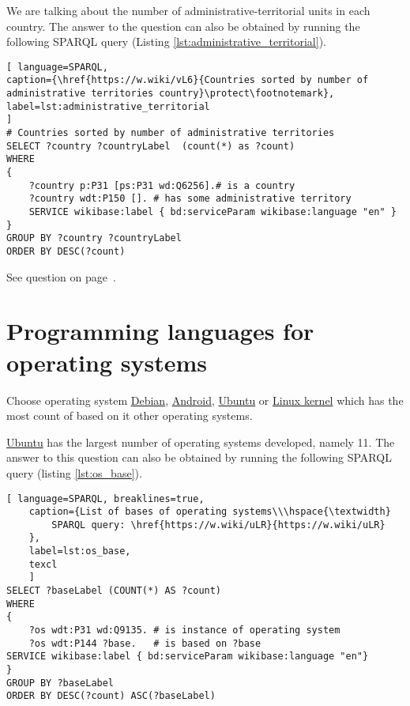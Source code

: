 We are talking about the number of administrative-territorial units in each country. The answer to the question can also be obtained by running the following SPARQL query (Listing \ref{lst:administrative_territorial}).

\begin{lstlisting}[ language=SPARQL, 
caption={\href{https://w.wiki/vL6}{Countries sorted by number of administrative territories country}\protect\footnotemark},
label=lst:administrative_territorial
]
# Countries sorted by number of administrative territories
SELECT ?country ?countryLabel  (count(*) as ?count)
WHERE
{
	?country p:P31 [ps:P31 wd:Q6256].# is a country
	?country wdt:P150 []. # has some administrative territory
	SERVICE wikibase:label { bd:serviceParam wikibase:language "en" }
}
GROUP BY ?country ?countryLabel
ORDER BY DESC(?count)
\end{lstlisting}

See question on page~\pageref{question:administrative_territorial}.




\section{Programming languages for operating systems}

\begin{exercise}%
	\label{answer:os_base}
	Choose operating system 
	\href{https://w.wiki/n8U}{Debian},
	\href{https://w.wiki/n8V}{Android},
	\href{https://w.wiki/n8W}{Ubuntu} or
	\href{https://w.wiki/n8X}{Linux kernel}
	which has the most count of based on it other operating systems.	
\end{exercise}

\href{https://w.wiki/n8W}{Ubuntu}  has the largest number of operating systems developed, namely 11. The answer to this question can also be obtained by running the following SPARQL query (listing \ref{lst:os_base}).

\begin{lstlisting}[ language=SPARQL, breaklines=true, 
	caption={List of bases of operating systems\\\hspace{\textwidth}
		SPARQL query: \href{https://w.wiki/uLR}{https://w.wiki/uLR}
	},
	label=lst:os_base,
	texcl 
	]
SELECT ?baseLabel (COUNT(*) AS ?count)
WHERE
{
	?os wdt:P31 wd:Q9135. # is instance of operating system
	?os wdt:P144 ?base.   # is based on ?base
SERVICE wikibase:label { bd:serviceParam wikibase:language "en"}
}
GROUP BY ?baseLabel
ORDER BY DESC(?count) ASC(?baseLabel)
\end{lstlisting}

